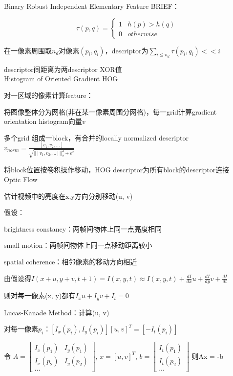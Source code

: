 \documentclass[UTF8]{ctexart}
\begin{document}
  Binary Robust Independent Elementary Feature BRIEF：

  \quad \begin{equation*}
      \tau(p, q) = \begin{cases}
      1 & h(p) > h(q)\\
      0 & otherwise
      \end{cases}
    \end{equation*}

  \quad 在一像素周围取$n_d$对像素$(p_i, q_i)$，descriptor为$\sum_{i \leq n_d} \tau(p_i, q_i) << i$

  \quad descriptor间距离为两descriptor XOR值\\
Histogram of Oriented Gradient HOG 

  对一区域的像素计算feature：

  \quad 将图像整体分为网格(非在某一像素周围分网格)，每一grid计算gradient orientation histogram向量$v$

  \quad 多个grid 组成一block，有合并的locally normalized descriptor$v_{norm} = \frac{[v_1, v_2, ...]}{\sqrt{||[v_1, v_2, ...]||_2^2 + \epsilon^2}}$

  \quad 将block位置按卷积操作移动，HOG descriptor为所有block的descriptor连接\\
Optic Flow

  估计视频中的亮度在x,y方向分别移动(u, v)

  假设：

  \quad brightness constancy：两帧间物体上同一点亮度相同

  \quad small motion：两帧间物体上同一点移动距离较小

  \quad spatial coherence：相邻像素的移动方向相近
  
  由假设得$I(x + u, y + v, t + 1) = I(x, y, t) \approx I(x, y, t) + \frac{dI}{dx}u + \frac{dI}{dy}v + \frac{dI}{dt}$

  \quad 则对每一像素(x, y)都有$I_xu + I_yv + I_t = 0$

  Lucas-Kanade Method：计算(u, v)

  \quad 对每一像素$p_i$：$[I_x(p_i), I_y(p_i)][u, v]^T = [-I_t(p_i)]$

  \quad 令
    $A = 
    \begin{bmatrix}
      I_x(p_1) & I_y(p_1) \\ 
      I_x(p_2) & I_y(p_2) \\ 
      ...
      \end{bmatrix}$, 
    $x = [u, v]^T$,
    $b = 
    \begin{bmatrix}
      I_t(p_1) \\ 
      I_t(p_2) \\ 
      ...
      \end{bmatrix}$
    则Ax = -b
\end{document}
